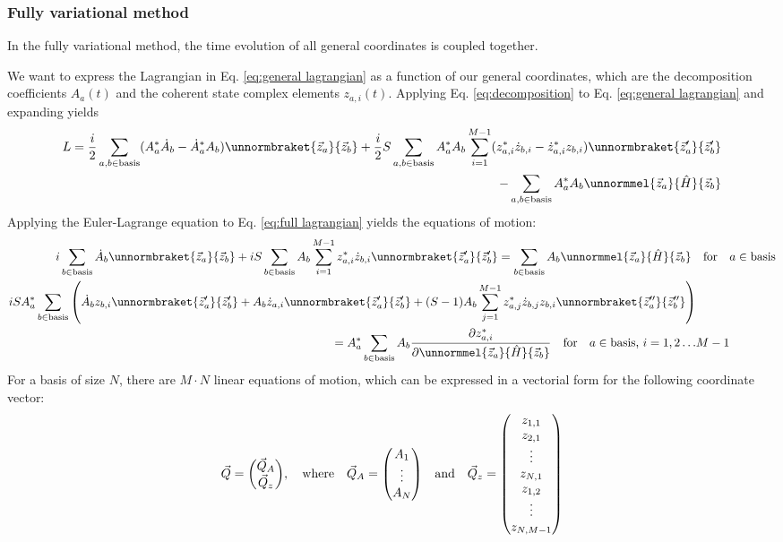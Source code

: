 \documentclass[12pt]{article}
\begin{document}
	\subsubsection{Fully variational method}\label{sec:variational}
	In the fully variational method, the time evolution of all general coordinates is coupled together.
	
	We want to express the Lagrangian in Eq. \ref{eq:general lagrangian} as a function of our general coordinates, which are the decomposition coefficients $A_a(t)$ and the coherent state complex elements $z_{a,i}(t)$. Applying Eq. \ref{eq:decomposition} to Eq. \ref{eq:general lagrangian} and expanding yields
	\begin{align}\label{eq:full lagrangian}
	\begin{split}
	L=\frac{i}{2}\sum_{a,b\in\text{basis}}(A_a^*\dot{A}_b-\dot{A}_a^*A_b)\unnormbraket{\vec{z}_a}{\vec{z}_b}+\frac{i}{2}S\sum_{a,b\in\text{basis}}A_a^*A_b\sum_{i=1}^{M-1}(z_{a,i}^*\dot{z}_{b,i}-\dot{z}^*_{a,i}z_{b,i})\unnormbraket{\vec{z}_a'}{\vec{z}_b'}\\
	-\sum_{a,b\in\text{basis}}A_a^*A_b\unnormmel{\vec{z}_a}{\hat{H}}{\vec{z}_b}
	\end{split}
	\end{align}
	Applying the Euler-Lagrange equation to Eq. \ref{eq:full lagrangian} yields the equations of motion:
	\begin{align}
	i\sum_{b\in\text{basis}}\dot{A}_b\unnormbraket{\vec{z}_a}{\vec{z}_b}+iS\sum_{b\in\text{basis}}A_b\sum_{i=1}^{M-1}z_{a,i}^*\dot{z}_{b,i}\unnormbraket{\vec{z}_a'}{\vec{z}_b'}=\sum_{b\in\text{basis}}A_b\unnormmel{\vec{z}_a}{\hat{H}}{\vec{z}_b}\qq{for}&a\in\text{basis}\\
	\begin{split}
	iSA_a^*\sum_{b\in\text{basis}}\left(\dot{A}_b z_{b,i}\unnormbraket{\vec{z}'_a}{\vec{z}'_b}+A_b\dot{z}_{a,i}\unnormbraket{\vec{z}'_a}{\vec{z}'_b}+(S-1)A_b\sum_{j=1}^{M-1}z_{a,j}^*\dot{z}_{b,j}z_{b,i}\unnormbraket{\vec{z}''_a}{\vec{z}''_b}\right)&\\
	=A_a^*\sum_{b\in\text{basis}}A_b\pdv{z^*_{a,i}}\unnormmel{\vec{z}_a}{\hat{H}}{\vec{z}_b}\qq{for}a\in\text{basis,  } i=1,2\dots &M-1
	\end{split}
	\end{align}
	For a basis of size $N$, there are $M\cdot N$ linear equations of motion, which can be expressed in a vectorial form for the following coordinate vector:
	\begin{equation}
	\vec{Q}=\mqty(\vec{Q}_A\\\vec{Q}_z),\qq{where}\vec{Q}_A=\mqty(A_1\\\vdots\\A_N)\qq{and}\vec{Q}_z=\mqty(z_{1,1}\\z_{2,1}\\\vdots\\z_{N,1}\\z_{1,2}\\\vdots\\z_{N,M-1})
	\end{equation}
\end{document}
